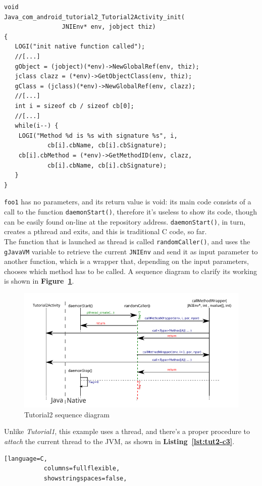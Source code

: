 \documentclass[a4paper,10pt]{article}
\newcommand{\keyword}[1]{\texttt{#1}}
\newcommand{\reff}[1]{\textbf{Figure~\ref{#1}}}
\newcommand{\refl}[1]{\textbf{Listing~\ref{#1}}}
\begin{document}
\begin{multicols}{2}
\begin{lstlisting}
void
Java_com_android_tutorial2_Tutorial2Activity_init(
				JNIEnv* env, jobject thiz)
{
   LOGI("init native function called");   
   //[...]   
   gObject = (jobject)(*env)->NewGlobalRef(env, thiz);
   jclass clazz = (*env)->GetObjectClass(env, thiz);
   gClass = (jclass)(*env)->NewGlobalRef(env, clazz);   
   //[...]   
   int i = sizeof cb / sizeof cb[0];
   //[...]   
   while(i--) {
   	LOGI("Method %d is %s with signature %s", i,
   			cb[i].cbName, cb[i].cbSignature);
   	cb[i].cbMethod = (*env)->GetMethodID(env, clazz,
   			cb[i].cbName, cb[i].cbSignature);
   }
}
\end{lstlisting}
\keyword{foo1} has no parameters, and its return value is void: its main code
consists of a call to the function \keyword{daemonStart()}, therefore it's
useless to show its code, though can be easily found on-line at the repository
address. \keyword{daemonStart()}, in turn, creates a pthread and exits, and this
is traditional C code, so far.\\
The function that is launched as thread is called \keyword{randomCaller()}, and
uses the \keyword{gJavaVM} variable to retrieve the current \keyword{JNIEnv} and
send it as input parameter to another function, which is a wrapper that,
depending on the input parameters, chooses which method has to be called. A
sequence diagram to clarify its working is shown in \reff{fig:tut12-seq}.
\begin{figure}[t]
 \includegraphics[width=17cm]{./figures/sequence.pdf}
 \caption{Tutorial2 sequence diagram}
 \label{fig:tut12-seq}
\end{figure}
Unlike \textit{Tutorial1}, this example uses a thread, and there's a proper
procedure to \textit{attach} the current thread to the JVM, as shown in
\refl{lst:tut2-c3}.
\begin{lstlisting}[language=C,
		   columns=fullflexible,
		   showstringspaces=false,

\end{lstlisting}
\end{multicols}
\end{document}

